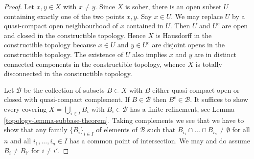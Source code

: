 \begin{proof}

Let $x, y \in X$ with $x \not = y$. Since $X$ is sober, there
is an open subset $U$ containing exactly one of the two points $x, y$.
Say $x \in U$. We may replace $U$ by a quasi-compact open
neighbourhood of $x$ contained in $U$. Then $U$ and $U^c$ are open and
closed in the constructible topology. Hence $X$ is Hausdorff in the
constructible topology because $x \in U$ and $y \in U^c$ are
disjoint opens in the constructible topology. The existence of $U$
also implies $x$ and $y$ are in distinct connected components in the
constructible topology, whence $X$ is totally disconnected in the
constructible topology.

\medskip\noindent
Let $\mathcal{B}$ be the collection of subsets $B \subset X$
with $B$ either quasi-compact open or closed with quasi-compact
complement. If $B \in \mathcal{B}$ then $B^c \in \mathcal{B}$.
It suffices to show every covering $X = \bigcup_{i \in I} B_i$
with $B_i \in \mathcal{B}$ has a finite refinement, see
Lemma \ref{topology-lemma-subbase-theorem}.
Taking complements we see that we have to show that any family
$\{B_i\}_{i \in I}$ of elements of $\mathcal{B}$
such that $B_{i_1} \cap \ldots \cap B_{i_n} \not = \emptyset$
for all $n$ and all $i_1, \ldots, i_n \in I$
has a common point of intersection. We may and do assume
$B_i \not = B_{i'}$ for $i \not = i'$.


\end{proof}
